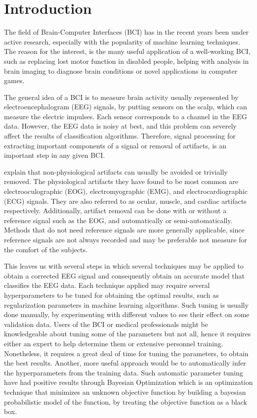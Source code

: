 \section{Introduction}
The field of Brain-Computer Interfaces (BCI) has in the recent years been under active research, especially with the popularity of machine learning techniques. The reason for the interest, is the many useful application of a well-working BCI, such as replacing lost motor function in disabled people, helping with analysis in brain imaging to diagnose brain conditions or novel applications in computer games. 

The general idea of a BCI is to measure brain activity usually represented by electroencephalogram (EEG) signals, by putting sensors on the scalp, which can measure the electric impulses. Each sensor corresponds to a channel in the EEG data. However, the EEG data is noisy at best, and this problem can severely affect the results of classification algorithms. Therefore, signal processing for extracting important components of a signal or removal of artifacts, is an important step in any given BCI.

\cite{uriguen2015eeg} explain that non-physiological artifacts can usually be avoided or trivially removed. The physiological artifacts they have found to be most common are electrooculographic (EOG), electromyographic (EMG), and electrocardiographic (ECG) signals. They are also referred to as ocular, muscle, and cardiac artifacts respectively. Additionally, artifact removal can be done with or without a reference signal such as the EOG, and automatically or semi-automatically. Methods that do not need reference signals are more generally applicable, since reference signals are not always recorded and may be preferable not measure for the comfort of the subjects. 

This leaves us with several steps in which several techniques may be applied to obtain a corrected EEG signal and consequently obtain an accurate model that classifies the EEG data. Each technique applied may require several hyperparameters to be tuned for obtaining the optimal results, such as regularization parameters in machine learning algorithms. Such tuning is usually done manually, by experimenting with different values to see their effect on some validation data. Users of the BCI or medical professionals might be knowledgeable about tuning some of the parameters but not all, hence it requires either an expert to help determine them or extensive personnel training. Nonetheless, it requires a great deal of time for tuning the parameters, to obtain the best results. Another, more useful approach would be to automatically infer the hyperparameters from the training data. Such automatic parameter tuning have had positive results through Bayesian Optimization \citep{brochu2010tutorial,snoek2012practical,shahriari2016taking} which is an optimization technique that minimizes an unknown objective function by building a bayesian probabilistic model of the function, by treating the objective function as a black box.

